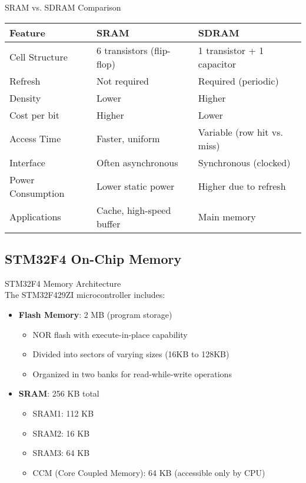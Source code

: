 \begin{concept}{SRAM vs. SDRAM Comparison}
\begin{center}
\begin{tabular}{|p{3cm}|p{4cm}|p{4cm}|}
\hline
\textbf{Feature} & \textbf{SRAM} & \textbf{SDRAM} \\
\hline
Cell Structure & 6 transistors (flip-flop) & 1 transistor + 1 capacitor \\
\hline
Refresh & Not required & Required (periodic) \\
\hline
Density & Lower & Higher \\
\hline
Cost per bit & Higher & Lower \\
\hline
Access Time & Faster, uniform & Variable (row hit vs. miss) \\
\hline
Interface & Often asynchronous & Synchronous (clocked) \\
\hline
Power Consumption & Lower static power & Higher due to refresh \\
\hline
Applications & Cache, high-speed buffer & Main memory \\
\hline
\end{tabular}
\end{center}
\end{concept}

\subsection{STM32F4 On-Chip Memory}

\begin{concept}{STM32F4 Memory Architecture}\\
The STM32F429ZI microcontroller includes:
\begin{itemize}
    \item \textbf{Flash Memory}: 2 MB (program storage)
    \begin{itemize}
        \item NOR flash with execute-in-place capability
        \item Divided into sectors of varying sizes (16KB to 128KB)
        \item Organized in two banks for read-while-write operations
    \end{itemize}
    \item \textbf{SRAM}: 256 KB total
    \begin{itemize}
        \item SRAM1: 112 KB
        \item SRAM2: 16 KB
        \item SRAM3: 64 KB
        \item CCM (Core Coupled Memory): 64 KB (accessible only by CPU)
    \end{itemize}
\end{itemize}
\end{concept}

